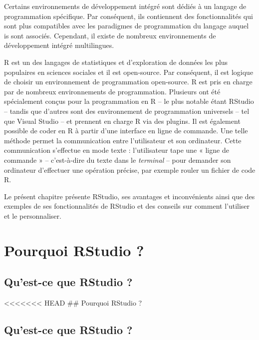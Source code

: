 \documentclass[
  letterpaper,
  DIV=11,
  numbers=noendperiod]{scrreprt}
\begin{document}
Certains environnements de développement intégré sont dédiés à un
langage de programmation spécifique. Par conséquent, ils contiennent des
fonctionnalités qui sont plus compatibles avec les paradigmes de
programmation du langage auquel is sont associés. Cependant, il existe
de nombreux environnements de développement intégré multilingues.

R est un des langages de statistiques et d'exploration de données les
plus populaires en sciences sociales et il est open-source. Par
conséquent, il est logique de choisir un environnement de programmation
open-source. R est pris en charge par de nombreux environnements de
programmation. Plusieurs ont été spécialement conçus pour la
programmation en R -- le plus notable étant RStudio -- tandis que
d'autres sont des environnement de programmation universels -- tel que
Visual Studio -- et prennent en charge R via des plugins. Il est
également possible de coder en R à partir d'une interface en ligne de
commande. Une telle méthode permet la communication entre l'utilisateur
et son ordinateur. Cette communication s'effectue en mode texte :
l'utilisateur tape une « ligne de commande » -- c'est-à-dire du texte
dans le \emph{terminal} -- pour demander son ordinateur d'effectuer une
opération précise, par exemple rouler un fichier de code R.

Le présent chapitre présente RStudio, ses avantages et inconvénients
ainsi que des exemples de ses fonctionnalités de RStudio et des conseils
sur comment l'utiliser et le personnaliser.

\hypertarget{pourquoi-rstudio}{%
\section{Pourquoi RStudio ?}\label{pourquoi-rstudio}}

\hypertarget{quest-ce-que-rstudio}{%
\subsection{Qu'est-ce que RStudio ?}\label{quest-ce-que-rstudio}}

\textless\textless\textless\textless\textless\textless\textless{} HEAD
\#\# Pourquoi RStudio ?

\hypertarget{quest-ce-que-rstudio-1}{%
\subsection{Qu'est-ce que RStudio ?}\label{quest-ce-que-rstudio-1}}
\end{document}
